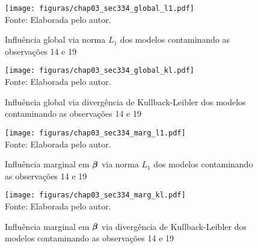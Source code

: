 \begin{figure}[H]
\begin{center}
\caption{Influência global via norma $L_1$ dos modelos contaminando as observações 14 e 19}
\label{fig:chap03_sec334_global_l1}
\texttt{[image: figuras/chap03\_sec334\_global\_l1.pdf]}
\\ Fonte: Elaborada pelo autor.
\end{center}
\end{figure}

\begin{figure}[H]
\begin{center}
\caption{Influência global via divergência de Kullback-Leibler dos modelos contaminando as observações 14 e 19}
\label{fig:chap03_sec334_global_kl}
\texttt{[image: figuras/chap03\_sec334\_global\_kl.pdf]}
\\ Fonte: Elaborada pelo autor.
\end{center}
\end{figure}

\begin{figure}[H]
\begin{center}
\caption{Influência marginal em ${\boldsymbol{\beta}}$ via norma $L_1$ dos modelos contaminando as observações 14 e 19}
\label{fig:chap03_sec334_marg_l1}
\texttt{[image: figuras/chap03\_sec334\_marg\_l1.pdf]}
\\ Fonte: Elaborada pelo autor.
\end{center}
\end{figure}

\begin{figure}[H]
\begin{center}
\caption{Influência marginal em ${\boldsymbol{\beta}}$ via divergência de Kullback-Leibler dos modelos contaminando as observações 14 e 19}
\label{fig:chap03_sec334_marg_kl}
\texttt{[image: figuras/chap03\_sec334\_marg\_kl.pdf]}
\\ Fonte: Elaborada pelo autor.
\end{center}
\end{figure}